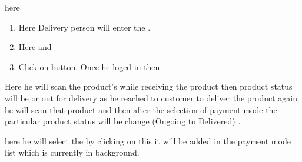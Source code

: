 \documentclass[a4paper,10pt,english]{report}
\begin{document}
\begin{figure}[htbp]
\centering

\noindent{}
\end{figure}

here
\begin{enumerate}
\def\theenumi{\arabic{enumi}}
\def\labelenumi{\theenumi .}
\makeatletter\def\p@enumii{\p@enumi \theenumi .}\makeatother
\item {} 
Here Delivery person will enter the .

\item {} 
Here  and

\item {} 
Click on   button. Once he loged in then

\end{enumerate}

\begin{figure}[htbp]
\centering

\noindent{}
\end{figure}

Here he will scan the product’s  while receiving the product then product status will be  or out for delivery as he reached to customer to deliver the product again he will scan that product and then after the selection of payment mode the particular product status will be change (Ongoing to Delivered) .

\begin{figure}[htbp]
\centering

\noindent{}
\end{figure}

here he will select the  by clicking on this it will be added in the payment mode list which is currently in background.

\begin{figure}[htbp]
\centering

\noindent{}
\end{figure}
\end{document}
